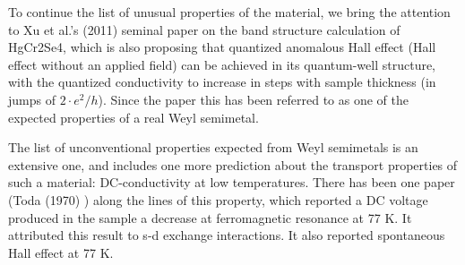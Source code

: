 \documentclass[preprint,pre,floats,aps,amsmath,amssymb]{revtex4}
\begin{document}
To continue the list of unusual properties of the material, we bring the attention to Xu et al.'s (2011) \cite{xu} seminal paper on the band structure calculation of HgCr2Se4, which is also proposing that quantized anomalous Hall effect (Hall effect without an applied field) can be achieved in its quantum-well structure, with the quantized conductivity to increase in steps with sample thickness (in jumps of $2\cdot e^2 / h$). Since the paper this has been referred to as one of the expected properties of a real Weyl semimetal. \cite{ashby}

The list of unconventional properties expected from Weyl semimetals is an extensive one, and includes one more prediction about the transport properties of such a material: DC-conductivity at low temperatures. There has been one paper (Toda (1970) \cite{toda}) along the lines of this property, which reported a DC voltage produced in the sample a decrease at ferromagnetic resonance at 77 K. It attributed this result to s-d exchange interactions. It also reported spontaneous Hall effect at 77 K. 
\end{document}
